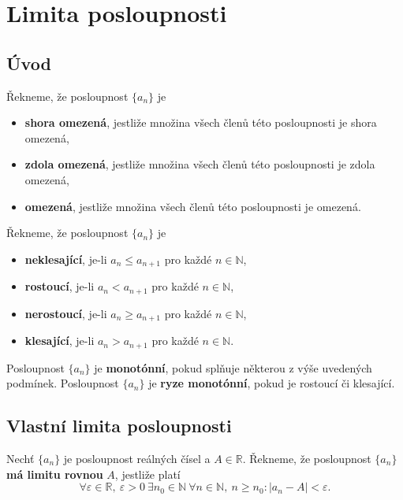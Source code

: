 \section{Limita posloupnosti}

\subsection{Úvod}

\begin{definice}
Řekneme, že posloupnost $\{a_n\}$ je
\begin{itemize}
  \item \textbf{shora omezená}, jestliže množina všech členů této posloupnosti je shora omezená,
  \item \textbf{zdola omezená}, jestliže množina všech členů této posloupnosti je zdola omezená,
  \item \textbf{omezená}, jestliže množina všech členů této posloupnosti je omezená.
\end{itemize}
\end{definice}

\begin{definice}
Řekneme, že posloupnost $\{a_n\}$ je
\begin{itemize}
  \item \textbf{neklesající}, je-li $a_n \le a_{n+1}$ pro každé $n \in \mathbb{N}$,
  \item \textbf{rostoucí}, je-li $a_n < a_{n+1}$ pro každé $n \in \mathbb{N}$,
  \item \textbf{nerostoucí}, je-li $a_n \ge a_{n+1}$ pro každé $n \in \mathbb{N}$,
  \item \textbf{klesající}, je-li $a_n > a_{n+1}$ pro každé $n \in \mathbb{N}$.
\end{itemize}
Posloupnost $\{a_n\}$ je \textbf{monotónní}, pokud splňuje některou z výše uvedených podmínek.
Posloupnost $\{a_n\}$ je \textbf{ryze monotónní}, pokud je rostoucí či klesající.
\end{definice}

\subsection{Vlastní limita posloupnosti}

\begin{definice}
Nechť $\{a_n\}$ je posloupnost reálných čísel a $A \in \mathbb{R}$.
Řekneme, že posloupnost $\{a_n\}$ \textbf{má limitu rovnou} $A$, jestliže platí
\[
\forall \varepsilon \in \mathbb{R}, \ \varepsilon > 0 \ \exists n_0 \in \mathbb{N}
\ \forall n \in \mathbb{N}, \ n \ge n_0 : |a_n - A| < \varepsilon.
\]
\end{definice}

